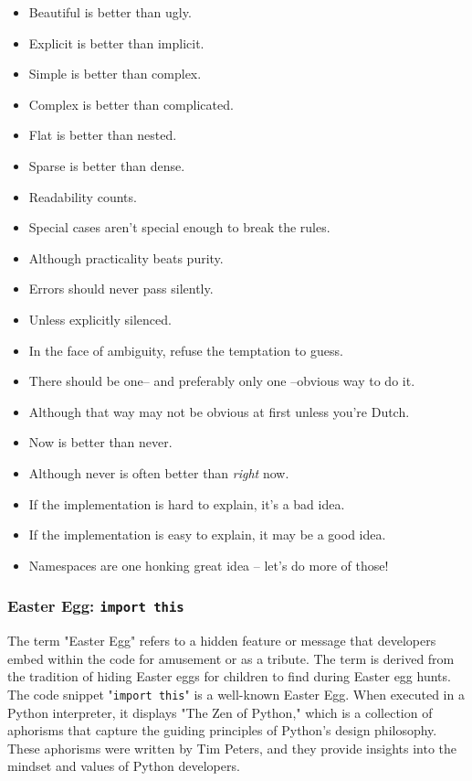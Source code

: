 \begin{itemize}
    \item Beautiful is better than ugly.
    \item Explicit is better than implicit.
    \item Simple is better than complex.
    \item Complex is better than complicated.
    \item Flat is better than nested.
    \item Sparse is better than dense.
    \item Readability counts.
    \item Special cases aren't special enough to break the rules.
    \item Although practicality beats purity.
    \item Errors should never pass silently.
    \item Unless explicitly silenced.
    \item In the face of ambiguity, refuse the temptation to guess.
    \item There should be one-- and preferably only one --obvious way to do it.
    \item Although that way may not be obvious at first unless you're Dutch.
    \item Now is better than never.
    \item Although never is often better than \textit{right} now.
    \item If the implementation is hard to explain, it's a bad idea.
    \item If the implementation is easy to explain, it may be a good idea.
    \item Namespaces are one honking great idea -- let's do more of those!
\end{itemize}

\subsubsection{Easter Egg: \texttt{import this}}
The term "Easter Egg" refers to a hidden feature or message that developers embed within the code for amusement or as a tribute. The term is derived from the tradition of hiding Easter eggs for children to find during Easter egg hunts.\\

The code snippet "\texttt{import this}" is a well-known Easter Egg. When executed in a Python interpreter, it displays "The Zen of Python," which is a collection of aphorisms that capture the guiding principles of Python's design philosophy. These aphorisms were written by Tim Peters, and they provide insights into the mindset and values of Python developers.

